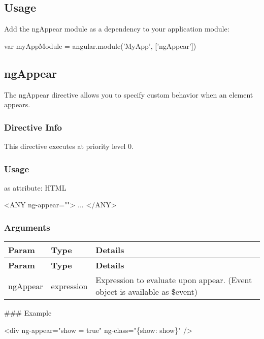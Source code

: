 \subsection*{Usage}

Add the ng\+Appear module as a dependency to your application module\+: 
\begin{DoxyCode}
var myAppModule = angular.module('MyApp', ['ngAppear'])
\end{DoxyCode}


\subsection*{ng\+Appear}

The ng\+Appear directive allows you to specify custom behavior when an element appears.

\subsubsection*{Directive Info}

This directive executes at priority level 0.

\subsubsection*{Usage}

as attribute\+: H\+T\+ML 
\begin{DoxyCode}
<ANY
  ng-appear="">
...
</ANY>
\end{DoxyCode}
 \subsubsection*{Arguments}

\tabulinesep=1mm
\begin{longtabu} spread 0pt [c]{*{3}{|X[-1]}|}
\hline
\rowcolor{\tableheadbgcolor}\textbf{ Param }&\textbf{ Type }&\textbf{ Details  }\\
\endfirsthead
\hline
\endfoot
\hline
\rowcolor{\tableheadbgcolor}\textbf{ Param }&\textbf{ Type }&\textbf{ Details  }\\
\endhead
ng\+Appear &expression &Expression to evaluate upon appear. (Event object is available as \$event) \\
\end{longtabu}
\#\#\# Example 
\begin{DoxyCode}
<div ng-appear="show = true" ng-class="\{show: show\}" />
\end{DoxyCode}


